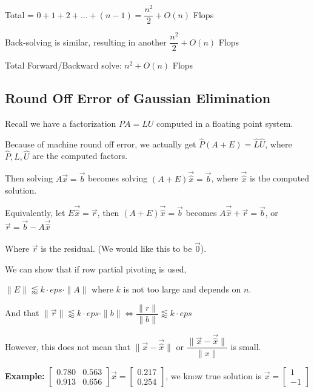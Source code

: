 \documentclass{article}
\begin{document}
\vspace{0.2cm}

Total = $0 + 1 + 2 + \dots + (n - 1) = \dfrac{n^2}{2} + O(n)$ Flops

Back-solving is similar, resulting in another $\dfrac{n^2}{2} + O(n)$ Flops

Total Forward/Backward solve: $n^2 + O(n)$ Flops

\subsection{Round Off Error of Gaussian Elimination}

Recall we have a factorization $PA = LU$ computed in a floating point system. 

Because of machine round off error, we actually get $\hat{P}(A + E) = \hat{L}\hat{U}$, where $\hat{P}, \hat{L}, \hat{U}$ are the computed factors.

\vspace{0.2cm}

Then solving $A \vec{x} = \vec{b}$ becomes solving $(A + E) \vec{\hat{x}} = \vec{b}$, where $\vec{\hat{x}}$ is the computed solution.

Equivalently, let $E \vec{\hat{x}} = \vec{r}$, then $(A + E) \vec{\hat{x}} = \vec{b}$ becomes $A \vec{\hat{x}} + \vec{r} = \vec{b}$, or $\vec{r} = \vec{b} - A \vec{\hat{x}}$

Where $\vec{r}$ is the residual. (We would like this to be $\vec{0}$).

\pagebreak

We can show that if row partial pivoting is used, 

\vspace{0.2cm}

$\| E \| \lessapprox k \cdot {eps} \cdot \| A \|$ where $k$ is not too large and depends on $n$.

\vspace{0.1cm}

And that $\| \vec{r} \| \lessapprox k \cdot {eps} \cdot \| b\| \Leftrightarrow \dfrac{\|r\|}{\|b\|} \lessapprox k \cdot {eps}$


\vspace{0.3cm}

However, this does not mean that $\| \vec{x} - \vec{\hat{x}} \|$ or $\dfrac{\| \vec{x} - \vec{\hat{x}} \|}{\| x\|}$ is small.

\vspace{0.3cm}

\textbf{Example:} $\begin{bmatrix}
0.780 & 0.563\\
0.913 & 0.656
\end{bmatrix} \vec{x} = \begin{bmatrix}
0.217\\
0.254
\end{bmatrix}$, we know true solution is $\vec{x} =  \begin{bmatrix}
1\\
-1
\end{bmatrix}$
\end{document}
